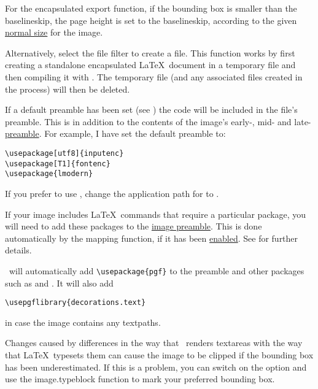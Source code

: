 \begin{information}
For the encapsulated export function,
if the bounding box is smaller than the baselineskip, the page
height is set to the baselineskip, according to the given
\hyperref[sec:normalsize]{normal size} for the image.
\end{information}

Alternatively, select the  file filter to create
a  file.  This function works by first creating a
standalone encapsulated \LaTeX\ document in a temporary file and
then compiling it with . The temporary file (and any
associated files created in the process) will then be deleted.

If a default preamble has been set (see
) the code will be included in the
 file's preamble.  This is in
addition to the contents of the image's early-, mid- and
late-\hyperref[sec:preamble]{preamble}. For example, I have set the
default preamble to:
\begin{verbatim}
\usepackage[utf8]{inputenc}
\usepackage[T1]{fontenc}
\usepackage{lmodern}
\end{verbatim}
If you prefer to use , change the application path for
 to .

If your image includes \LaTeX\ commands that require a particular
package, you will need to add these packages to the
\hyperref[sec:preamble]{image preamble}. This is done automatically
by the mapping function, if it has been
\hyperref[mi:texmappings]{enabled}.  See
 for further details.

\FlowframTk\ will automatically add
\verb|\usepackage{pgf}| to the preamble and other packages such as
 and . It will also add
\begin{verbatim}
\usepgflibrary{decorations.text}
\end{verbatim}
in case the image contains any \glspl{textpath}.

\begin{warning}
Changes caused by differences in the way that \FlowframTk\ renders
\glspl{textarea} with the way that \LaTeX\ typesets them
can cause the image to be clipped if the bounding box
has been underestimated. If this is a problem, you can switch on
the 
option and use the \gls{image.typeblock} function to mark your
preferred bounding box.
\end{warning}

